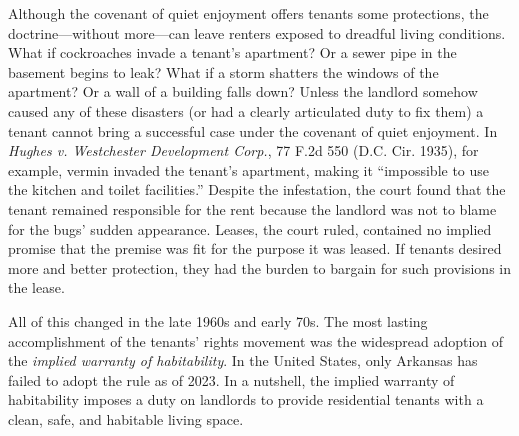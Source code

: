 Although the covenant of quiet enjoyment offers tenants some protections, the
doctrine---without more---can leave renters exposed to dreadful living
conditions.  What if cockroaches invade a tenant's apartment? Or a sewer pipe
in the basement begins to leak?  What if a storm shatters the windows of the
apartment? Or a wall of a building falls down?  Unless the landlord somehow
caused any of these disasters (or had a clearly articulated duty to fix them) a
tenant cannot bring a successful case under the covenant of quiet enjoyment. 
In \textit{Hughes v. Westchester Development Corp.}, 77 F.2d 550 (D.C. Cir.
1935), for example, vermin invaded the tenant's apartment, making it
``impossible to use the kitchen and toilet facilities.'' Despite the
infestation, the court found that the tenant remained responsible for the rent
because the landlord was not to blame for the bugs' sudden appearance.  Leases,
the court ruled, contained no implied promise that the premise was fit for the
purpose it was leased.  If tenants desired more and better protection, they had
the burden to bargain for such provisions in the lease. 

All of this changed in the late 1960s and early 70s.  The most lasting
accomplishment of the tenants' rights movement was the widespread adoption of
the \textit{implied warranty of habitability}. In the United States, only
Arkansas has failed to adopt the rule as of 2023.  In a nutshell, the implied
warranty of
habitability imposes a duty on landlords to provide residential tenants with a
clean, safe, and habitable living space. 

